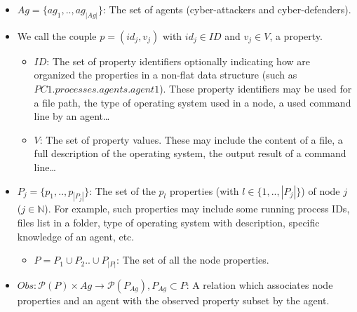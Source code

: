 \documentclass[conference]{IEEEtran}
\begin{document}
\begin{itemize}

    \item $Ag = \{ag_1,..,ag_{|Ag|}\}$: The set of agents (cyber-attackers and cyber-defenders).

    \item We call the couple $p = (id_{j}, v_{j})$ with $id_j \in {ID}$ and $v_j \in V$, a property.
    \begin{itemize}
        \item $ID$: The set of property identifiers optionally indicating how are organized the properties in a non-flat data structure (such as $PC1.processes.agents.agent1$). These property identifiers may be used for a file path, the type of operating system used in a node, a used command line by an agent\dots
        \item $V$: The set of property values. These may include the content of a file, a full description of the operating system, the output result of a command line\dots
    \end{itemize}

    \item $P_{j} = \{ p_1, .., p_{|P_{j}|} \}$: The set of the $p_{l}$ properties (with $l \in \{1,..,|P_{j}|\}$) of node $j$ ($j \in \mathbb{N} $). For example, such properties may include some running process IDs, files list in a folder, type of operating system with description, specific knowledge of an agent, etc.
    \begin{itemize}
        \item $P = P_1 \cup P_2 .. \cup P_{|P|} $: The set of all the node properties.
    \end{itemize}

    \item $Obs: \mathcal{P}(P) \times Ag \rightarrow \mathcal{P}(P_{Ag}), P_{Ag} \subset P$: A relation which associates node properties and an agent with the observed property subset by the agent.
    

\end{itemize}
\end{document}
